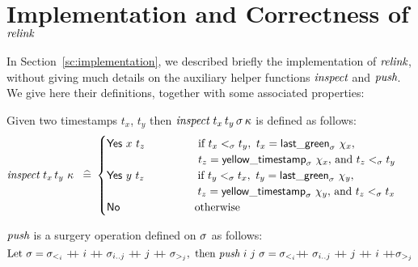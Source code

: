 \section{Implementation and Correctness of $\textit{relink}$}
\label{sc:relink-lemmas}
\def\cat{{\mathbin{+\!\!+}}}

In Section~\ref{sc:implementation}, we described briefly the
implementation of $\textit{relink}$, without giving much details on the
auxiliary helper functions $\textit{inspect}$ and $\textit{push}$. We give
here their definitions, together with some associated properties:

\begin{definition}[inspect]\label{def:inspect}%
Given two timestamps $t_x$, $t_y$ then $\textit{inspect}\ t_x\, t_y\,
\sigma\, \kappa$ is defined as follows:
\begin{equation*}
\aux{inspect}\ t_x\, t_y\ \C\ \eqdef
\begin{cases}
  \mathsf{Yes}\ x\ t_z\ \qquad \qquad
      \begin{array}[t]{l}
      \textrm{if}\ t_x \tle t_y,\ t_x = \mathsf{last\_green}_\ordlist\ \histx, \\
       t_z = \mathsf{yellow\_timestamp}_\ordlist\ \histx,\,
       \textrm{and} \ t_z \tle t_y
      \end{array} \\[5pt]
  \mathsf{Yes}\ y\ t_z\ \qquad \qquad
      \begin{array}[t]{l}
      \textrm{if}\ t_y \tle t_x,\ t_y = \mathsf{last\_green}_\ordlist\ \histy, \\
       t_z = \mathsf{yellow\_timestamp}_\ordlist\ \histy,\,
       \textrm{and} \ t_z \tle t_x
      \end{array} \\[5pt]
  \mathsf{No}\hphantom{\mathsf{s}\ x\ t_z}\ \qquad \qquad \textrm{otherwise}
\end{cases}
\end{equation*}
\end{definition}

\begin{definition}[push]\label{def:push}%
 $\textit{push}$ is a surgery operation defined on $\sigma$ as
  follows:
\[\hfill
  \textrm{Let}\ \ordlist = \ordlist_{<_i}\ \cat
  \ i\ \cat\ \ordlist_{i..j}\ \cat\ j\ \cat\ \ordlist_{>_j},\
  \textrm{then}\
  \aux{push}\ i\ j\ \ordlist =
  \ordlist_{<_i} \cat\  \ordlist_{i..j}\ \cat\ j\ \cat\ i\ \cat \ordlist_{>_j}
  \hfill
\]
\end{definition}

